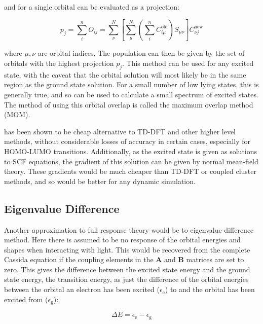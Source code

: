 and for a single orbital can be evaluated as a projection:

\begin{equation}
p_j = \sum^n_i O_{ij} = \sum^N_\nu \left[\sum^N_\mu\left(\sum^n_i C_{i\mu}^{\text{old}}\right)S_{\mu\nu}\right]C^{\text{new}}_{\nu j}
\end{equation}

where $\mu,\nu$ are orbital indices. The population can then be given by the set
of orbitals with the highest projection $p_j$.  This method can be used for any
excited state, with the caveat that the orbital solution will most likely be in
the same region as the ground state solution. For a small number of low lying states,
this is generally  true, and so \dscf can be used to calculate a small spectrum of
excited states\cite{Gilbert2008}. The method of using this orbital overlap is called
the maximum overlap method (MOM)\cite{Gilbert2008}.

\dscf has been shown to be cheap alternative to TD-DFT and other higher level
methods\cite{Liu2004, Gavnholt2008, Besley2009}, without considerable losses of
accuracy in certain cases, especially for HOMO-LUMO transitions\cite{Kowalczyk2011}.
Additionally, as the excited state is given as solutions to SCF equations,
the gradient of this solution can be given by normal mean-field theory.
These gradients would be much cheaper than TD-DFT or coupled cluster methods, and
so would be better for any dynamic simulation\cite{Gavnholt2008}.

\subsection{Eigenvalue Difference}
\label{subsec:eigval_diff}
Another approximation to full response theory would be to eigenvalue difference method. 
Here there is assumed to be no response of the orbital energies and shapes when 
interacting with light. This would be recovered from the complete Cassida equation
if the coupling elements in the $\mathbf{A}$ and $\mathbf{B}$ matrices are set to zero.
This gives the difference between the excited state energy and the ground state
energy, the transition energy, as just the difference of the orbital energies between
the orbital an electron has been excited ($\epsilon_{\text{e}}$) to and the orbital
has been excited from ($\epsilon_{\text{g}}$):

\begin{equation}
\Delta E = \epsilon_{\text{e}} - \epsilon_{\text{g}}
\end{equation}

